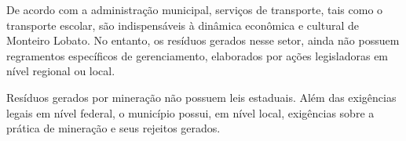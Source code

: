 	De acordo com a administração municipal, serviços de transporte, tais como o transporte escolar, são indispensáveis à dinâmica econômica e cultural de Monteiro Lobato. No entanto, os resíduos gerados nesse setor, ainda não possuem regramentos específicos de gerenciamento, elaborados por ações legisladoras em nível regional ou local.
	
	Resíduos gerados por mineração não possuem leis estaduais. Além das exigências legais em nível federal, o município possui, em nível local, exigências sobre a prática de mineração e seus rejeitos gerados.
	
	